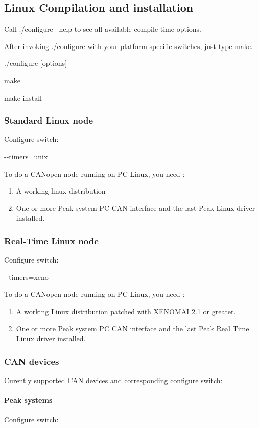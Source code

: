 \documentclass[a4paper,12pt]{book}
\newcommand\liststyleLvii{%
\renewcommand\labelitemi{{--}}
\renewcommand\labelitemii{{--}}
\renewcommand\labelitemiii{{--}}
\renewcommand\labelitemiv{{--}}
}
\newcommand\liststyleLviii{%
\renewcommand\labelitemi{{--}}
\renewcommand\labelitemii{{--}}
\renewcommand\labelitemiii{{--}}
\renewcommand\labelitemiv{{--}}
}
\begin{document}
\subsection{Linux Compilation and installation}
Call ./configure {--}help to see all available compile time options.

After invoking ./configure with your platform specific switches, just
type make.

{\ttfamily
./configure [options]}

{\ttfamily
make}

{\ttfamily
make install}

\subsubsection{Standard Linux node}
Configure switch:

{\ttfamily
 {}-{}-timers=unix}

To do a CANopen node running on PC{}-Linux, you need :

\liststyleLvii
\begin{enumerate}
\item A working linux distribution
\item One or more Peak system PC CAN interface and the last Peak Linux
driver installed.
\end{enumerate}
\subsubsection{Real{}-Time Linux node}
Configure switch:

{\ttfamily
 {}-{}-timers=xeno}

To do a CANopen node running on PC{}-Linux, you need :

\liststyleLviii
\begin{enumerate}
\item A working Linux distribution patched with XENOMAI 2.1 or greater.
\item One or more Peak system PC CAN interface and the last Peak Real
Time Linux driver installed.
\end{enumerate}
\subsubsection{CAN devices}
Curently supported CAN devices and corresponding configure switch:

\paragraph{Peak systems}
Configure switch:
\end{document}
